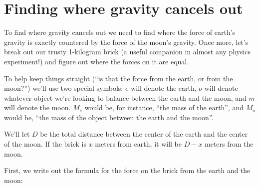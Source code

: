 \documentclass[12pt,letterpaper]{article}
\begin{document}
\section{Finding where gravity cancels out}

To find where gravity cancels out we need to find where the force of
earth's gravity is exactly countered by the force of the moon's
gravity.  Once more, let's break out our trusty 1-kilogram brick (a
useful companion in almost any physics experiment!) and figure out where the forces on it are equal.

To help keep things straight (``is that the force from the earth, or from the
moon?'') we'll use two special symbols: $e$ will denote the earth, $o$
will denote whatever object we're looking to balance between the earth
and the moon, and $m$ will denote the moon.  $M_{e}$ would be, for
instance, ``the mass of the earth'', and $M_{o}$ would be,
``the mass of the object between the earth and the moon''.

We'll let $D$ be the total distance between the center of the earth
and the center of the moon.  If the brick is $x$ meters from earth, it
will be $D-x$ meters from the moon.

First, we write out the formula for the force on the brick from the earth and
the moon:
\end{document}
